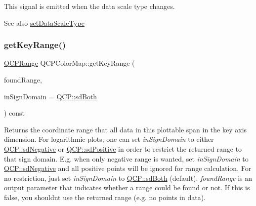 This signal is emitted when the data scale type changes.

\begin{DoxySeeAlso}{See also}
\mbox{\hyperlink{class_q_c_p_color_map_a9d20aa08e3c1f20f22908c45b9c06511}{set\+Data\+Scale\+Type}} 
\end{DoxySeeAlso}
\mbox{\label{class_q_c_p_color_map_a985861974560f950af6cb7fae8c46267}} 
\subsubsection{\texorpdfstring{get\+Key\+Range()}{getKeyRange()}}
{\footnotesize\ttfamily \mbox{\hyperlink{class_q_c_p_range}{Q\+C\+P\+Range}} Q\+C\+P\+Color\+Map\+::get\+Key\+Range (\begin{DoxyParamCaption}\item[{bool \&}]{found\+Range,  }\item[{\mbox{\hyperlink{namespace_q_c_p_afd50e7cf431af385614987d8553ff8a9}{Q\+C\+P\+::\+Sign\+Domain}}}]{in\+Sign\+Domain = {\ttfamily \mbox{\hyperlink{namespace_q_c_p_afd50e7cf431af385614987d8553ff8a9aa38352ef02d51ddfa4399d9551566e24}{Q\+C\+P\+::sd\+Both}}} }\end{DoxyParamCaption}) const\hspace{0.3cm}{\ttfamily [virtual]}}

Returns the coordinate range that all data in this plottable span in the key axis dimension. For logarithmic plots, one can set {\itshape in\+Sign\+Domain} to either \mbox{\hyperlink{namespace_q_c_p_afd50e7cf431af385614987d8553ff8a9a2d18af0bc58f6528d1e82ce699fe4829}{Q\+C\+P\+::sd\+Negative}} or \mbox{\hyperlink{namespace_q_c_p_afd50e7cf431af385614987d8553ff8a9a584784b75fb816abcc627cf743bb699f}{Q\+C\+P\+::sd\+Positive}} in order to restrict the returned range to that sign domain. E.\+g. when only negative range is wanted, set {\itshape in\+Sign\+Domain} to \mbox{\hyperlink{namespace_q_c_p_afd50e7cf431af385614987d8553ff8a9a2d18af0bc58f6528d1e82ce699fe4829}{Q\+C\+P\+::sd\+Negative}} and all positive points will be ignored for range calculation. For no restriction, just set {\itshape in\+Sign\+Domain} to \mbox{\hyperlink{namespace_q_c_p_afd50e7cf431af385614987d8553ff8a9aa38352ef02d51ddfa4399d9551566e24}{Q\+C\+P\+::sd\+Both}} (default). {\itshape found\+Range} is an output parameter that indicates whether a range could be found or not. If this is false, you shouldn\textquotesingle{}t use the returned range (e.\+g. no points in data).

